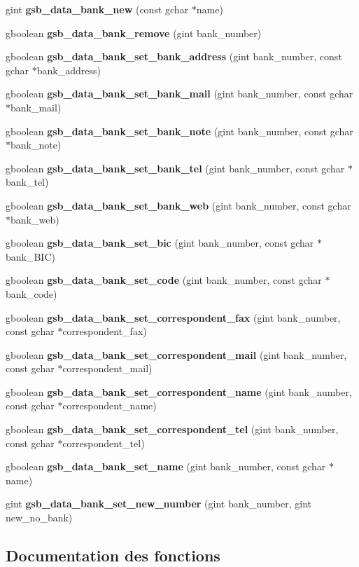 \begin{DoxyCompactItemize}
\item 
gint {\bf gsb\_\-data\_\-bank\_\-new} (const gchar $\ast$name)
\item 
gboolean {\bf gsb\_\-data\_\-bank\_\-remove} (gint bank\_\-number)
\item 
gboolean {\bf gsb\_\-data\_\-bank\_\-set\_\-bank\_\-address} (gint bank\_\-number, const gchar $\ast$bank\_\-address)
\item 
gboolean {\bf gsb\_\-data\_\-bank\_\-set\_\-bank\_\-mail} (gint bank\_\-number, const gchar $\ast$bank\_\-mail)
\item 
gboolean {\bf gsb\_\-data\_\-bank\_\-set\_\-bank\_\-note} (gint bank\_\-number, const gchar $\ast$bank\_\-note)
\item 
gboolean {\bf gsb\_\-data\_\-bank\_\-set\_\-bank\_\-tel} (gint bank\_\-number, const gchar $\ast$bank\_\-tel)
\item 
gboolean {\bf gsb\_\-data\_\-bank\_\-set\_\-bank\_\-web} (gint bank\_\-number, const gchar $\ast$bank\_\-web)
\item 
gboolean {\bf gsb\_\-data\_\-bank\_\-set\_\-bic} (gint bank\_\-number, const gchar $\ast$bank\_\-BIC)
\item 
gboolean {\bf gsb\_\-data\_\-bank\_\-set\_\-code} (gint bank\_\-number, const gchar $\ast$bank\_\-code)
\item 
gboolean {\bf gsb\_\-data\_\-bank\_\-set\_\-correspondent\_\-fax} (gint bank\_\-number, const gchar $\ast$correspondent\_\-fax)
\item 
gboolean {\bf gsb\_\-data\_\-bank\_\-set\_\-correspondent\_\-mail} (gint bank\_\-number, const gchar $\ast$correspondent\_\-mail)
\item 
gboolean {\bf gsb\_\-data\_\-bank\_\-set\_\-correspondent\_\-name} (gint bank\_\-number, const gchar $\ast$correspondent\_\-name)
\item 
gboolean {\bf gsb\_\-data\_\-bank\_\-set\_\-correspondent\_\-tel} (gint bank\_\-number, const gchar $\ast$correspondent\_\-tel)
\item 
gboolean {\bf gsb\_\-data\_\-bank\_\-set\_\-name} (gint bank\_\-number, const gchar $\ast$name)
\item 
gint {\bf gsb\_\-data\_\-bank\_\-set\_\-new\_\-number} (gint bank\_\-number, gint new\_\-no\_\-bank)
\end{DoxyCompactItemize}


\subsection{Documentation des fonctions}
